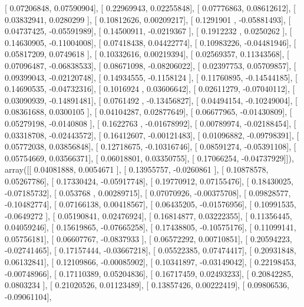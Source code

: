 \documentclass{article}
\begin{document}
       [ 0.07206848,  0.07590904],
       [ 0.22969943,  0.02255848],
       [ 0.07776863,  0.08612612],
       [ 0.03832941,  0.0280299 ],
       [ 0.10812626,  0.00209217],
       [ 0.1291901 , -0.05881493],
       [ 0.04737425, -0.05591989],
       [ 0.14500911, -0.0219367 ],
       [ 0.1912232 ,  0.0250262 ],
       [ 0.14630905, -0.11004008],
       [ 0.07418438,  0.04422774],
       [ 0.10983226, -0.04481946],
       [ 0.05817209,  0.0749618 ],
       [ 0.10332616,  0.00219394],
       [ 0.02569357,  0.11343568],
       [ 0.07096487, -0.06838533],
       [ 0.08671098, -0.08206022],
       [ 0.02397753,  0.05709857],
       [ 0.09399043, -0.02120748],
       [ 0.14934555, -0.1158124 ],
       [ 0.11760895, -0.14544185],
       [ 0.14690535, -0.04732316],
       [ 0.1016924 ,  0.03606642],
       [ 0.02611279, -0.07040112],
       [ 0.03090939, -0.14891481],
       [ 0.0761492 , -0.13456827],
       [ 0.04494154, -0.10249004],
       [ 0.08361688,  0.0300105 ],
       [ 0.04104287,  0.02877649],
       [ 0.06677965, -0.01430809],
       [ 0.05279198, -0.0140808 ],
       [ 0.1622763 , -0.01678992],
       [ 0.00789974, -0.02188454],
       [ 0.03318708, -0.02443572],
       [ 0.16412607, -0.00121483],
       [ 0.01096882, -0.09798391],
       [ 0.05772038,  0.03856848],
       [ 0.12718675, -0.10316746],
       [ 0.08591274, -0.05391108],
       [ 0.05754669,  0.03566371],
       [ 0.06018801,  0.03350755],
       [ 0.17066254, -0.04737929]]), array([[ 0.04081888,  0.0054671 ],
       [ 0.13955757, -0.0260861 ],
       [ 0.10878578,  0.05267786],
       [ 0.17330424, -0.05917748],
       [ 0.19770912,  0.07155476],
       [ 0.18430025, -0.07185732],
       [ 0.053768  ,  0.00289715],
       [ 0.07070926, -0.00375708],
       [ 0.09828577, -0.10482774],
       [ 0.07166138,  0.00418567],
       [ 0.06435205, -0.01576956],
       [ 0.10991535, -0.0649272 ],
       [ 0.05190841,  0.02476924],
       [ 0.16814877,  0.03222355],
       [ 0.11356445,  0.04059246],
       [ 0.15619865, -0.07665258],
       [ 0.17438805, -0.10575176],
       [ 0.11099141,  0.05756181],
       [ 0.06607767, -0.0837933 ],
       [ 0.06572292,  0.00710851],
       [ 0.20594223, -0.02741465],
       [ 0.17157444, -0.03667218],
       [ 0.05522385,  0.07474417],
       [ 0.20931848,  0.06132841],
       [ 0.12109866, -0.00085902],
       [ 0.10341897, -0.03149042],
       [ 0.22198453, -0.00748966],
       [ 0.17110389,  0.05204836],
       [ 0.16717459,  0.02493233],
       [ 0.20842285,  0.0803234 ],
       [ 0.21020526,  0.01123489],
       [ 0.13857426,  0.00222419],
       [ 0.09806536, -0.09061104],
\end{document}
